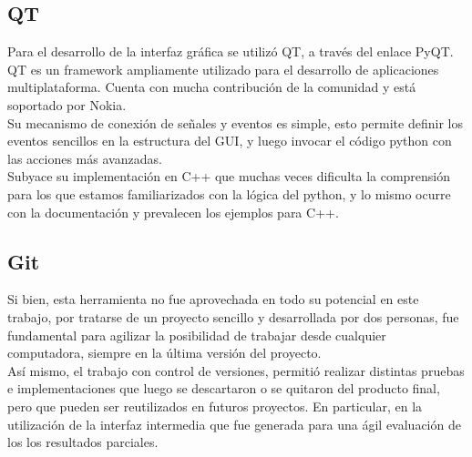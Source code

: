 \subsection*{QT}
Para el desarrollo de la interfaz gr\'afica se utiliz\'o QT, a trav\'es del enlace PyQT.\\
QT es un framework ampliamente utilizado para el desarrollo de aplicaciones multiplataforma. Cuenta con mucha contribuci\'on de la comunidad y est\'a soportado por Nokia.\\ Su mecanismo de conexión de señales y eventos es simple, esto permite definir los eventos sencillos en la estructura del GUI, y luego invocar el c\'odigo python con las acciones m\'as avanzadas.\\
Subyace su implementaci\'on en C++ que muchas veces dificulta la comprensi\'on para los que estamos familiarizados con la l\'ogica del python, y lo mismo ocurre con la documentaci\'on y prevalecen los ejemplos para C++.\\

\subsection*{Git}
Si bien, esta herramienta no fue aprovechada en todo su potencial en este trabajo, por tratarse de un proyecto sencillo y desarrollada por dos personas, fue fundamental para agilizar la posibilidad de trabajar desde cualquier computadora, siempre en la \'ultima versi\'on del proyecto.\\
As\'i mismo, el trabajo con control de versiones, permiti\'o realizar distintas pruebas e implementaciones que luego se descartaron o se quitaron del producto final, pero que pueden ser reutilizados en futuros proyectos. En particular, en la utilizaci\'on de la interfaz intermedia que fue generada para una \'agil evaluaci\'on de los los resultados parciales.\\









